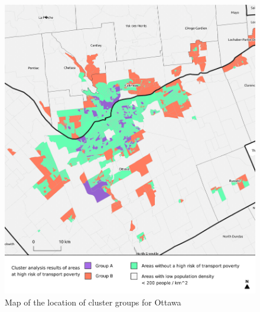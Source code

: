 \documentclass[11 pt, letterpaper]{article}
\begin{document}
{\begin{figure}[H]
	\caption{Map of the location of cluster groups for Ottawa} 
	\label{C_ott}
	\centerline{\includegraphics[width=6.5in]{figures/cluster_maps/C_ott}}
	\vspace{2mm}
\end{figure}

}
\end{document}

